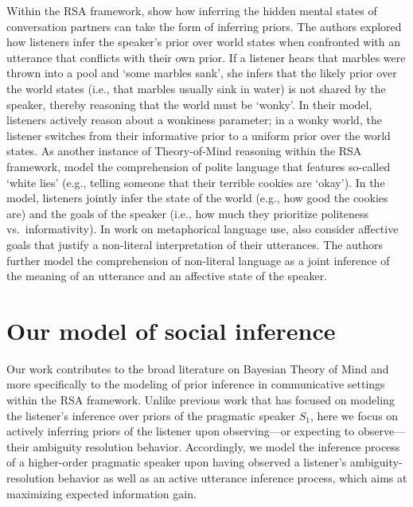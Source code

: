\documentclass[11pt,a4paper]{article}
\begin{document}
Within the RSA framework,  show how inferring the hidden mental states of conversation partners can take the form of inferring priors.
The authors explored how listeners infer the speaker's prior over world states when confronted with an utterance that conflicts with their own prior.
If a listener hears that marbles were thrown into a pool and `some marbles sank', she infers that the likely prior over the world states (i.e., that marbles usually sink in water) is not shared by the speaker, thereby reasoning that the world must be `wonky'. In their model, listeners actively reason about a wonkiness parameter; in a wonky world, the listener switches from their informative prior to a uniform prior over the world states.
As another instance of Theory-of-Mind reasoning within the RSA framework,  model the comprehension of polite language that features so-called `white lies' (e.g., telling someone that their terrible cookies are `okay').
In the model, listeners jointly infer the state of the world (e.g., how good the cookies are) and the goals of the speaker (i.e., how much they prioritize politeness vs.~informativity).  
In work on metaphorical language use,  also consider affective goals that justify a non-literal interpretation of their utterances.
The authors further model the comprehension of non-literal language as a joint inference of the meaning of an utterance and an affective state of the speaker. %




\section{Our model of social inference} \label{socialRSA}
Our work contributes to the broad literature on Bayesian Theory of Mind and more specifically to the modeling of prior inference in communicative settings within the RSA framework.
Unlike previous work that has focused on modeling the listener's inference over priors of the pragmatic speaker $S_1$, here we focus on actively inferring priors of the listener upon observing---or expecting to observe---their ambiguity resolution behavior.
Accordingly, we model the inference process of a higher-order pragmatic speaker upon having observed a listener's ambiguity-resolution behavior as well as an active utterance inference process, which aims at maximizing expected information gain. 
\end{document}
